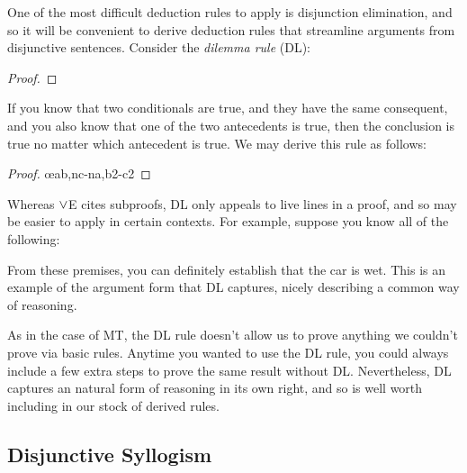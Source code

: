 One of the most difficult deduction rules to apply is disjunction elimination, and so it will be convenient to derive deduction rules that streamline arguments from disjunctive sentences.
Consider the \textit{dilemma rule} (DL):

\begin{proof}
	 
\end{proof}

If you know that two conditionals are true, and they have the same consequent, and you also know that one of the two antecedents is true, then the conclusion is true no matter which antecedent is true.
We may derive this rule as follows:

\begin{proof}
	\open
		\as{}
  \close
  \open
    \metaB\as{}
  \close
	 \oe{ab,nc-na,b2-c2}
\end{proof}

Whereas $\vee$E cites subproofs, DL only appeals to live lines in a proof, and so may be easier to apply in certain contexts.
For example, suppose you know all of the following:

\begin{earg}
\end{earg}

From these premises, you can definitely establish that the car is wet.
This is an example of the argument form that DL captures, nicely describing a common way of reasoning.

As in the case of MT, the DL rule doesn't allow us to prove anything we couldn't prove via basic rules.
Anytime you wanted to use the DL rule, you could always include a few extra steps to prove the same result without DL.
Nevertheless, DL captures an natural form of reasoning in its own right, and so is well worth including in our stock of derived rules.




\subsection{Disjunctive Syllogism}
  \label{DS}

